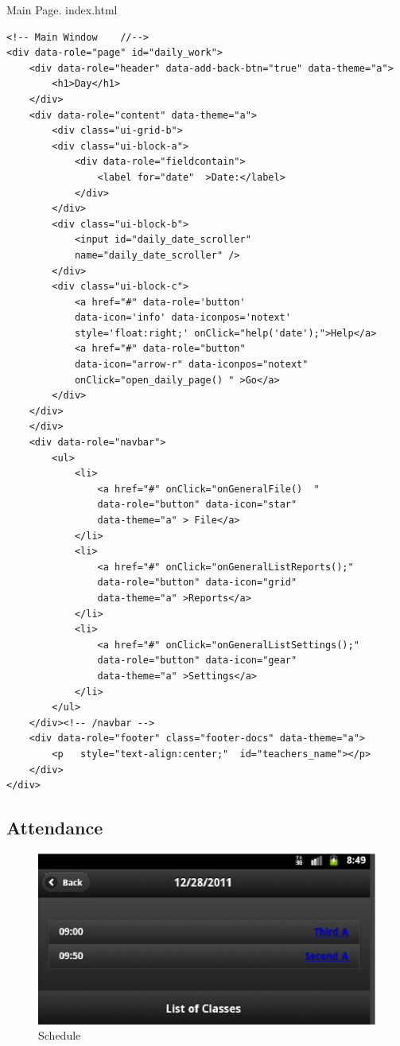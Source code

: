 \begin{bclogo}[couleur=blue!30,arrondi=0.1,ombre=true ] 
{Main Page. index.html \label{main_page}}
\begin{verbatim}
<!-- Main Window    //-->
<div data-role="page" id="daily_work">
    <div data-role="header" data-add-back-btn="true" data-theme="a">
        <h1>Day</h1>
    </div>
    <div data-role="content" data-theme="a">
        <div class="ui-grid-b">
        <div class="ui-block-a">
            <div data-role="fieldcontain">
                <label for="date"  >Date:</label>
            </div>
        </div>
        <div class="ui-block-b">
            <input id="daily_date_scroller" 
            name="daily_date_scroller" />
        </div>
        <div class="ui-block-c">
            <a href="#" data-role='button' 
            data-icon='info' data-iconpos='notext' 
            style='float:right;' onClick="help('date');">Help</a>
            <a href="#" data-role="button" 
            data-icon="arrow-r" data-iconpos="notext"  
            onClick="open_daily_page() " >Go</a>
        </div>
    </div>
    </div>
    <div data-role="navbar">
        <ul>
            <li>
                <a href="#" onClick="onGeneralFile()  "  
                data-role="button" data-icon="star"  
                data-theme="a" > File</a>
            </li>
            <li>
                <a href="#" onClick="onGeneralListReports();"  
                data-role="button" data-icon="grid"  
                data-theme="a" >Reports</a>
            </li>
            <li>
                <a href="#" onClick="onGeneralListSettings();" 
                data-role="button" data-icon="gear"   
                data-theme="a" >Settings</a>
            </li>
        </ul>
    </div><!-- /navbar -->
    <div data-role="footer" class="footer-docs" data-theme="a">
        <p   style="text-align:center;"  id="teachers_name"></p>
    </div>
</div>
\end{verbatim}
\end{bclogo}

\newpage
\subsection{Attendance}

\begin{figure}
    \begin{center}
        \includegraphics{eduxes_schedule1.eps}
        \caption{Schedule}
        \label{fig:EduXesSchedule}
    \end{center}
\end{figure}





